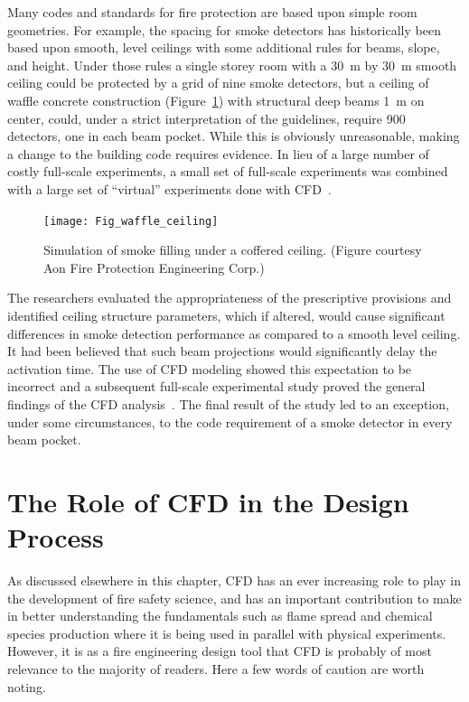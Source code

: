 \documentclass[graybox]{svmult}
\begin{document}
Many codes and standards for fire protection are based upon simple room geometries. For example, the spacing for smoke detectors has historically been based upon smooth, level ceilings with some additional rules for beams, slope, and height.  Under those rules a single storey room with a 30~m by 30~m smooth ceiling could be protected by a grid of nine smoke detectors, but a ceiling of waffle concrete construction (Figure~\ref{waffle_ceiling}) with structural deep beams 1~m on center, could, under a strict interpretation of the guidelines, require 900 detectors, one in each beam pocket. While this is obviously unreasonable, making a change to the building code requires evidence. In lieu of a large number of costly full-scale experiments, a small set of full-scale experiments was combined with a large set of ``virtual'' experiments done with CFD~\cite{O'Connor:NFPRF,Mealy:NFPRF}.
\begin{figure}[ht]
\texttt{[image: Fig\_waffle\_ceiling]}
\caption{Simulation of smoke filling under a coffered ceiling. (Figure courtesy Aon Fire Protection Engineering Corp.)}
\label{waffle_ceiling}
\end{figure}
The researchers evaluated the appropriateness of the prescriptive provisions and identified ceiling structure parameters, which if altered, would cause significant differences in smoke detection performance as compared to a smooth level ceiling. It had been believed that such beam projections would significantly delay the activation time. The use of CFD modeling showed this expectation to be incorrect and a subsequent full-scale experimental study proved the general findings of the CFD analysis~\cite{Gottuk:2008}. The final result of the study led to an exception, under some circumstances, to the code requirement of a smoke detector in every beam pocket.


\section{The Role of CFD in the Design Process}

As discussed elsewhere in this chapter, CFD has an ever increasing role to play in the development of fire safety science, and has an important contribution to make in better understanding the fundamentals such as flame spread and chemical species production where it is being used in parallel with physical experiments. However, it is as a fire engineering design tool that CFD is probably of most relevance to the majority of readers. Here a few words of caution are worth noting.
\end{document}

